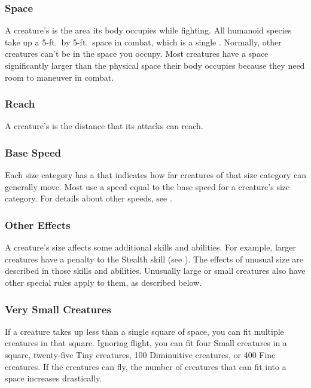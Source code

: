         \subsubsection{Space}\label{Space}
            A creature's  is the area its body occupies while fighting.
            All humanoid species take up a 5-ft.\ by 5-ft.\ space in combat, which is a single .
            Normally, other creatures can't be in the space you occupy.
            Most creatures have a space significantly larger than the physical space their body occupies because they need room to maneuver in combat.

        \subsubsection{Reach}\label{Reach}
            A creature's  is the distance that its  attacks can reach.

        \subsubsection{Base Speed}\label{Base Speed}
            Each size category has a  that indicates how far creatures of that size category can generally move.
            Most  use a speed equal to the base speed for a creature's size category.
            For details about other speeds, see .

        \subsubsection{Other Effects}
            A creature's size affects some additional skills and abilities.
            For example, larger creatures have a penalty to the Stealth skill (see ).
            The effects of unusual size are described in those skills and abilities.
            Unusually large or small creatures also have other special rules apply to them, as described below.

        \subsubsection{Very Small Creatures}
             If a creature takes up less than a single square of space, you can fit multiple creatures in that square.
            Ignoring flight, you can fit four Small creatures in a square, twenty-five Tiny creatures, 100 Diminuitive creatures, or 400 Fine creatures.
            If the creatures can fly, the number of creatures that can fit into a space increases drastically.

